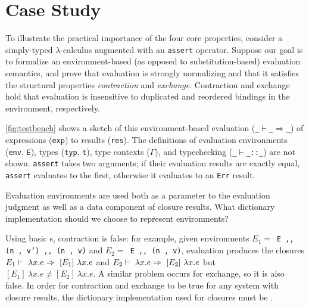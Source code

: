 \section{Case Study}
\label{sec:CaseStudy}



To illustrate the practical importance of the four core properties, consider a simply-typed $\lambda$-calculus augmented with an \texttt{assert} operator.
%
Suppose our goal is to formalize an environment-based (as opposed to substitution-based) evaluation semantics,
%
and prove that evaluation is strongly normalizing and that it satisfies the structural properties \emph{contraction} and \emph{exchange}.
%
Contraction and exchange hold that evaluation is insensitive to duplicated and reordered bindings in the environment, respectively.

\autoref{fig:testbench} shows a sketch of this environment-based evaluation (\texttt{\_$\vdash$\_$\Rightarrow$\_}) of expressions (\texttt{exp}) to results (\texttt{res}).
%
The definitions of evaluation environments (\texttt{env}, \texttt{E}), types (\texttt{typ}, \texttt{t}), type contexts ($\Gamma$), and typechecking (\texttt{\_$\vdash$\_::\_}) are not shown.
%
%
\texttt{assert} takes two arguments; if their evaluation results are exactly equal, \texttt{assert} evaluates to the first,
otherwise it evaluates to an \texttt{Err} result.

Evaluation environments are used both as a parameter to the evaluation judgment as well as a data component of closure results.
%
What dictionary implementation should we choose to represent environments?

%

Using basic \sal{}s, contraction is false:
%
for example, given environments
%
$E_1=$\ \texttt{E ,, (n , v') ,, (n , v)} and
%
$E_2=$\ \texttt{E ,, (n , v)},
%
evaluation produces the closures
%
$E_1 \vdash~\lambda x. e \Rightarrow~[E_1]\ \lambda x. e$
%
and
%
$E_2 \vdash~\lambda x. e \Rightarrow~[E_2]\ \lambda x. e$
%
but
%
$[E_1]\ \lambda x. e \neq [E_2]\ \lambda x. e$.
%
A similar problem occurs for exchange, so it is also false.
%
In order for contraction and exchange to be true for any system with closure results,
the dictionary implementation used for closures must be \extensional.


